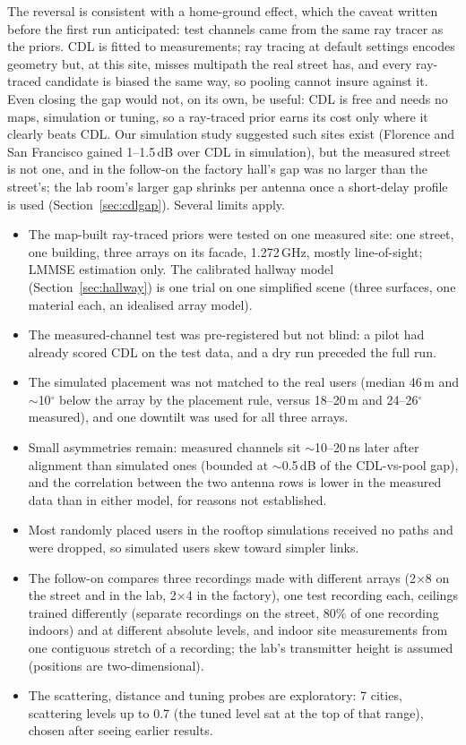 \documentclass[11pt]{article}
\begin{document}
The reversal is consistent with a home-ground effect, which the caveat written
before the first run anticipated: test channels came from the same ray tracer as the
priors. CDL is fitted to measurements; ray tracing at default settings encodes
geometry but, at this site, misses multipath the real street has, and every
ray-traced candidate is biased the same way, so pooling cannot insure against
it. Even closing the gap would not, on its own, be useful: CDL is free and
needs no maps, simulation or tuning, so a ray-traced prior earns its cost only
where it clearly beats CDL. Our simulation study suggested such sites exist
(Florence and San Francisco gained 1--1.5\,dB over CDL in simulation), but the
measured street is not one, and in the follow-on the factory hall's gap was no
larger than the street's; the lab room's larger gap shrinks per antenna once a
short-delay profile is used (Section~\ref{sec:cdlgap}).
Several limits apply.
\begin{itemize}
\item The map-built ray-traced priors were tested on one measured site: one street, one building, three arrays on its
  facade, 1.272\,GHz, mostly line-of-sight; LMMSE estimation only. The
  calibrated hallway model (Section~\ref{sec:hallway}) is one trial on one
  simplified scene (three surfaces, one material each, an idealised array
  model).
\item The measured-channel test was pre-registered but not blind: a pilot had
  already scored CDL on the test data, and a dry run preceded the full run.
\item The simulated placement was not matched to the real users (median 46\,m
  and $\sim$10$^\circ$ below the array by the placement rule, versus
  18--20\,m and 24--26$^\circ$ measured), and one downtilt was used for all
  three arrays.
\item Small asymmetries remain: measured channels sit $\sim$10--20\,ns later
  after alignment than simulated ones (bounded at $\sim$0.5\,dB of the
  CDL-vs-pool gap), and the correlation between the two antenna rows is lower
  in the measured data than in either model, for reasons not established.
\item Most randomly placed users in the rooftop simulations received no paths
  and were dropped, so simulated users skew toward simpler links.
\item The follow-on compares three recordings made with different arrays
  (2$\times$8 on the street and in the lab, 2$\times$4 in the factory), one
  test recording each, ceilings trained differently (separate recordings on
the street, 80\% of one recording indoors) and at different absolute levels,
and indoor site
  measurements from one contiguous stretch of a recording; the lab's
  transmitter height is assumed (positions are two-dimensional).
\item The scattering, distance and tuning probes are exploratory: 7
  cities, scattering levels up to 0.7 (the tuned level sat at the top of that
  range), chosen after seeing earlier results.
\end{itemize}
\end{document}
